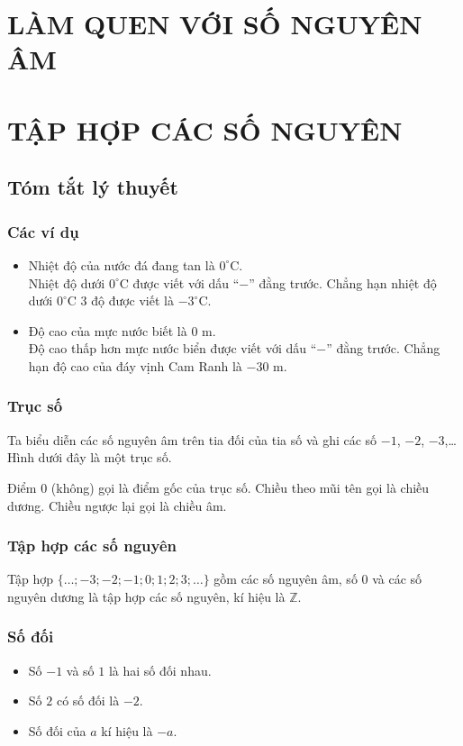 \section{LÀM QUEN VỚI SỐ NGUYÊN ÂM}
\section{TẬP HỢP CÁC SỐ NGUYÊN}
\subsection{Tóm tắt lý thuyết}
\subsubsection{Các ví dụ}
\begin{itemize}
\item Nhiệt độ của nước đá đang tan là $0^\circ$C.\\
Nhiệt độ dưới $0^\circ$C được viết với dấu ``$-$'' đằng trước. Chẳng hạn nhiệt độ dưới $0^\circ$C $3$ độ được viết là $-3^\circ$C.
\item Độ cao của mực nước biết là $0$ m.\\
Độ cao thấp hơn mực nước biển được viết với dấu ``$-$'' đằng trước. Chẳng hạn độ cao của đáy vịnh Cam Ranh là $-30$ m.
\end{itemize}
\subsubsection{Trục số}
Ta biểu diễn các số nguyên âm trên tia đối của tia số và ghi các số $-1$, $-2$, $-3$,\ldots\\
Hình dưới đây là một trục số.
\begin{center}
\end{center}
Điểm $0$ (không) gọi là điểm gốc của trục số. Chiều theo mũi tên gọi là chiều dương. Chiều ngược lại gọi là chiều âm.
\subsubsection{Tập hợp các số nguyên}
Tập hợp $\{\ldots; -3; -2; -1; 0; 1; 2; 3;\ldots\}$ gồm các số nguyên âm, số $0$ và các số nguyên dương là tập hợp các số nguyên, kí hiệu là $\mathbb{Z}$.
\subsubsection{Số đối}
\begin{itemize}
\item Số $-1$ và số $1$ là hai số đối nhau.
\item Số $2$ có số đối là $-2$.
\item Số đối của $a$ kí hiệu là $-a$.
\end{itemize}
